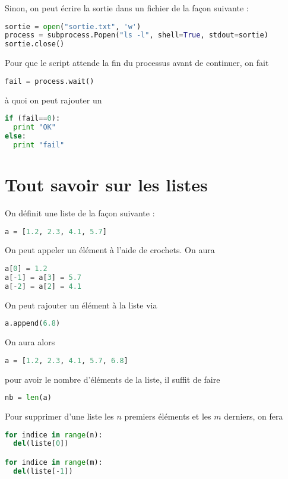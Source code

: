 \documentclass[a4paper,twoside]{article}
\begin{document}
Sinon, on peut écrire la sortie dans un fichier de la façon suivante :
\begin{lstlisting}[language=python]
sortie = open("sortie.txt", 'w')
process = subprocess.Popen("ls -l", shell=True, stdout=sortie)
sortie.close()
\end{lstlisting}

Pour que le script attende la fin du processus avant de continuer, on fait
\begin{lstlisting}[language=python]
fail = process.wait()
\end{lstlisting}
à quoi on peut rajouter un
\begin{lstlisting}[language=python]
if (fail==0):
  print "OK"
else:
  print "fail"
\end{lstlisting}









\section{Tout savoir sur les listes}
On définit une liste de la façon suivante :
\begin{lstlisting}[language=python]
a = [1.2, 2.3, 4.1, 5.7]
\end{lstlisting}

On peut appeler un élément à l'aide de crochets. On aura
\begin{lstlisting}[language=python]
a[0] = 1.2
a[-1] = a[3] = 5.7
a[-2] = a[2] = 4.1
\end{lstlisting}

On peut rajouter un élément à la liste via
\begin{lstlisting}[language=python]
a.append(6.8)
\end{lstlisting}
On aura alors
\begin{lstlisting}[language=python]
a = [1.2, 2.3, 4.1, 5.7, 6.8]
\end{lstlisting}

pour avoir le nombre d'éléments de la liste, il suffit de faire
\begin{lstlisting}[language=python]
nb = len(a)
\end{lstlisting}

Pour supprimer d'une liste les $n$ premiers éléments et les $m$ derniers, on fera
\begin{lstlisting}[language=python]
for indice in range(n):
  del(liste[0])

for indice in range(m):
  del(liste[-1])
\end{lstlisting}
\end{document}
